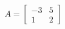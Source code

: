 \documentclass[preview]{standalone}
\begin{document}
\begin{align*}
A = \begin{bmatrix} -3 & 5 \\ 1 & 2 \end{bmatrix}
\end{align*}
\end{document}
